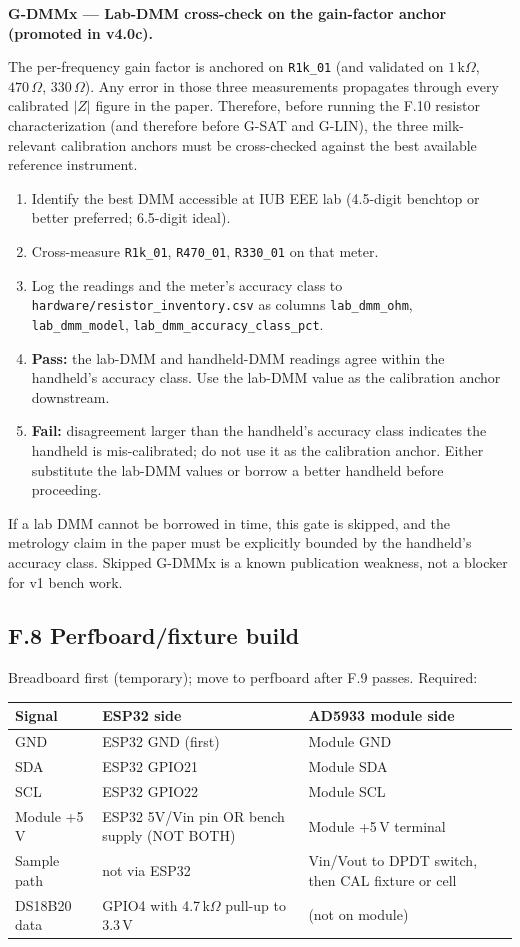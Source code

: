 \documentclass[11pt,a4paper]{article}
\newcommand{\kohm}[1]{\ensuremath{#1\,\mathrm{k}\Omega}}
\newcommand{\Rohm}[1]{\ensuremath{#1\,\Omega}}
\begin{document}
\begin{gatebox}
\textbf{G-DMMx --- Lab-DMM cross-check on the gain-factor anchor (promoted in v4.0c).}

The per-frequency gain factor is anchored on \texttt{R1k\_01} (and validated on \kohm{1}, \Rohm{470}, \Rohm{330}). Any error in those three measurements propagates through every calibrated $|Z|$ figure in the paper. Therefore, before running the F.10 resistor characterization (and therefore before G-SAT and G-LIN), the three milk-relevant calibration anchors must be cross-checked against the best available reference instrument.
\begin{enumerate}
\item Identify the best DMM accessible at IUB EEE lab (4.5-digit benchtop or better preferred; 6.5-digit ideal).
\item Cross-measure \texttt{R1k\_01}, \texttt{R470\_01}, \texttt{R330\_01} on that meter.
\item Log the readings and the meter's accuracy class to \texttt{hardware/resistor\_inventory.csv} as columns \texttt{lab\_dmm\_ohm}, \texttt{lab\_dmm\_model}, \texttt{lab\_dmm\_accuracy\_class\_pct}.
\item \textbf{Pass:} the lab-DMM and handheld-DMM readings agree within the handheld's accuracy class. Use the lab-DMM value as the calibration anchor downstream.
\item \textbf{Fail:} disagreement larger than the handheld's accuracy class indicates the handheld is mis-calibrated; do not use it as the calibration anchor. Either substitute the lab-DMM values or borrow a better handheld before proceeding.
\end{enumerate}
If a lab DMM cannot be borrowed in time, this gate is skipped, and the metrology claim in the paper must be explicitly bounded by the handheld's accuracy class. Skipped G-DMMx is a known publication weakness, not a blocker for v1 bench work.
\end{gatebox}

\subsection{F.8 Perfboard/fixture build}

Breadboard first (temporary); move to perfboard after F.9 passes. Required:

\begin{xltabular}{\textwidth}{L{35mm}L{35mm}Y}
\toprule
\textbf{Signal} & \textbf{ESP32 side} & \textbf{AD5933 module side}\\
\midrule
GND & ESP32 GND (first) & Module GND\\
SDA & ESP32 GPIO21 & Module SDA\\
SCL & ESP32 GPIO22 & Module SCL\\
Module +5\,V & ESP32 5V/Vin pin OR bench supply (NOT BOTH) & Module +5\,V terminal\\
Sample path & not via ESP32 & Vin/Vout to DPDT switch, then CAL fixture or cell\\
DS18B20 data & GPIO4 with 4.7\,k$\Omega$ pull-up to 3.3\,V & (not on module)\\
\bottomrule
\end{xltabular}
\end{document}
